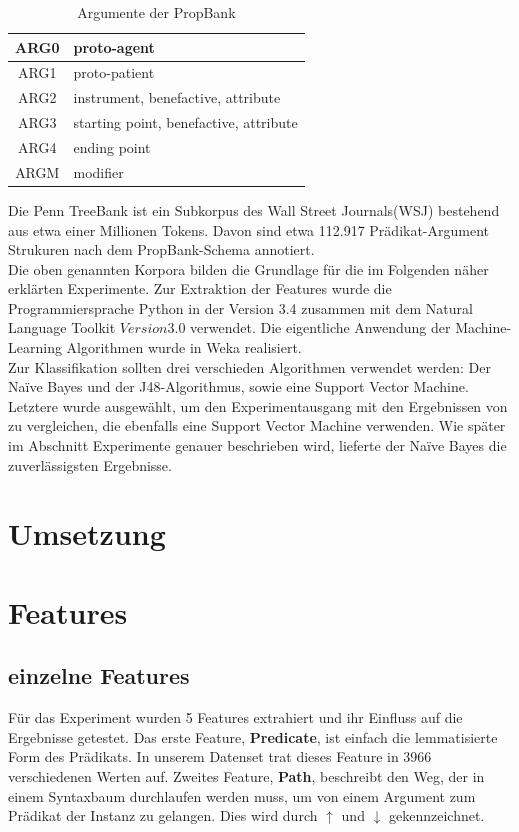 \documentclass[]{article}
\begin{document}
\begin{table}
	\centering
	\begin{tabular}{|c|l|}
	\hline 
	ARG0 & proto-agent \\ 
	\hline 
	ARG1 & proto-patient \\ 
	\hline 
	ARG2 & instrument, benefactive, attribute \\ 
	\hline 
	ARG3 & starting point, benefactive, attribute \\ 
	\hline 
	ARG4 & ending point \\ 
	\hline 
	ARGM & modifier \\ 
	\hline 
	\end{tabular}
	\caption{Argumente der PropBank}
	\end{table}
	Die Penn TreeBank \cite{Marcus93buildinga} ist ein Subkorpus des Wall Street Journals(WSJ) bestehend aus etwa einer Millionen Tokens. Davon sind etwa 112.917 Prädikat-Argument Strukuren nach dem PropBank-Schema annotiert. 
	\\
	Die oben genannten Korpora bilden die Grundlage für die im Folgenden näher erklärten Experimente.
	Zur Extraktion der Features wurde die Programmiersprache Python in der Version 3.4 zusammen mit dem Natural Language Toolkit \(Version 3.0\) verwendet. Die eigentliche Anwendung der Machine-Learning Algorithmen wurde in Weka \cite{Hall+FHPRW:2009} realisiert.
	\\
	Zur Klassifikation sollten drei verschieden Algorithmen verwendet werden:
	Der Naïve Bayes und der J48-Algorithmus, sowie eine Support
	Vector Machine. Letztere wurde ausgewählt, um den Experimentausgang mit den Ergebnissen von \cite{Pradhan05supportvector} zu vergleichen, die ebenfalls eine Support Vector Machine verwenden.
	Wie später im Abschnitt Experimente genauer beschrieben wird, lieferte der Naïve Bayes die zuverlässigsten Ergebnisse. 
	
	



\section{Umsetzung} 

\section{Features}
\subsection{einzelne Features}
Für das Experiment wurden 5 Features extrahiert und ihr Einfluss auf die Ergebnisse getestet. Das erste Feature, \textbf{Predicate}, ist einfach die lemmatisierte Form des Prädikats. In unserem Datenset trat dieses Feature in 3966 verschiedenen Werten auf. Zweites Feature, \textbf{Path}, beschreibt den Weg, der in einem Syntaxbaum durchlaufen werden muss, um von einem Argument zum Prädikat der Instanz zu gelangen. Dies wird durch $\uparrow$ und $\downarrow$ gekennzeichnet.
\end{document}
